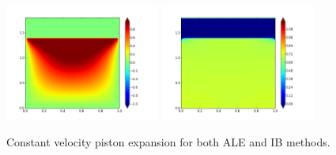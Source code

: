 \documentclass{article}
\begin{document}
\begin{figure}
{\includegraphics[width=2in]{contour-V25-IBexp.png} \hspace{-20pt}
\includegraphics[width=2in]{contour-P25-IBexp.png} 
}
\caption{\label{fig:constexp} Constant velocity piston expansion for both ALE and IB methods.} 
\end{figure}
%
\end{document}
